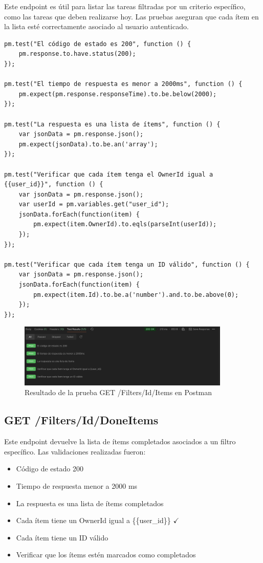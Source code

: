 \documentclass{report}
\begin{document}
Este endpoint es útil para listar las tareas filtradas por un criterio específico, como las tareas que deben realizarse hoy. Las pruebas aseguran que cada ítem en la lista esté correctamente asociado al usuario autenticado.

\begin{lstlisting}
pm.test("El código de estado es 200", function () {
    pm.response.to.have.status(200);
});

pm.test("El tiempo de respuesta es menor a 2000ms", function () {
    pm.expect(pm.response.responseTime).to.be.below(2000);
});

pm.test("La respuesta es una lista de ítems", function () {
    var jsonData = pm.response.json();
    pm.expect(jsonData).to.be.an('array');
});

pm.test("Verificar que cada ítem tenga el OwnerId igual a {{user_id}}", function () {
    var jsonData = pm.response.json();
    var userId = pm.variables.get("user_id");
    jsonData.forEach(function(item) {
        pm.expect(item.OwnerId).to.eqls(parseInt(userId));
    });
});

pm.test("Verificar que cada ítem tenga un ID válido", function () {
    var jsonData = pm.response.json();
    jsonData.forEach(function(item) {
        pm.expect(item.Id).to.be.a('number').and.to.be.above(0);
    });
});
\end{lstlisting}

\begin{figure}[h!]
    \centering
    \includegraphics[width=0.9\textwidth]{./imgs/tc2postman.png}
    \caption{Resultado de la prueba GET /Filters/Id/Items en Postman}
    \label{fig:tc2postman}
\end{figure}

\subsection{GET /Filters/Id/DoneItems}
Este endpoint devuelve la lista de ítems completados asociados a un filtro específico. Las validaciones realizadas fueron:
\begin{itemize}
    \item Código de estado 200 \checkmark
    \item Tiempo de respuesta menor a 2000 ms \checkmark
    \item La respuesta es una lista de ítems completados \checkmark
    \item Cada ítem tiene un OwnerId igual a \{\{user\_id\}\} $\checkmark$
    \item Cada ítem tiene un ID válido \checkmark
    \item Verificar que los ítems estén marcados como completados \checkmark
\end{itemize}
\end{document}
